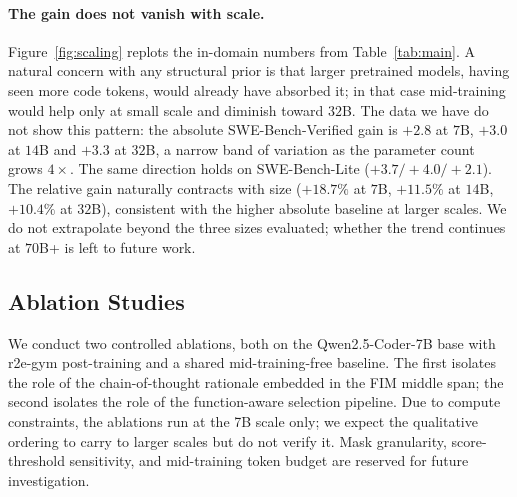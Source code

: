 \paragraph{The gain does not vanish with scale.}
Figure~\ref{fig:scaling} replots the in-domain numbers from
Table~\ref{tab:main}. A natural concern with any structural prior is that
larger pretrained models, having seen more code tokens, would already have
absorbed it; in that case mid-training would help only at small scale and
diminish toward $32$B. The data we have do not show this pattern: the
absolute SWE-Bench-Verified gain is $+2.8$ at $7$B, $+3.0$ at $14$B and
$+3.3$ at $32$B, a narrow band of variation as the parameter count grows
$4{\times}$. The same direction holds on SWE-Bench-Lite ($+3.7/+4.0/+2.1$).
The relative gain naturally contracts with size ($+18.7\%$ at $7$B,
$+11.5\%$ at $14$B, $+10.4\%$ at $32$B), consistent with the higher
absolute baseline at larger scales. We do not extrapolate beyond the three
sizes evaluated; whether the trend continues at $70$B+ is left to future
work.


\subsection{Ablation Studies}
\label{sec:exp:ablation}

We conduct two controlled ablations, both on the Qwen2.5-Coder-7B base
with r2e-gym post-training and a shared mid-training-free baseline. The
first isolates the role of the chain-of-thought rationale embedded in the
FIM middle span; the second isolates the role of the function-aware
selection pipeline. Due to compute constraints, the ablations run at the
7B scale only; we expect the qualitative ordering to carry to larger
scales but do not verify it. Mask granularity, score-threshold
sensitivity, and mid-training token budget are reserved for future
investigation.

